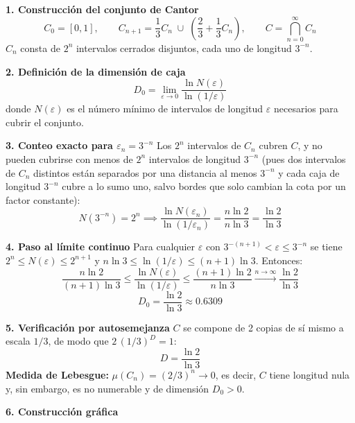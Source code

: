\documentclass[11pt,a4paper]{article}
\newenvironment{solucion}[1][Solución Detallada]{%
    \vspace{1.5mm}%
    \noindent{\large\textbf{Solución:}}\par\vspace{1.5mm}%
}{%
    \par\vspace{3mm}%
}
\begin{document}
\begin{solucion}

\textbf{\large 1. Construcción del conjunto de Cantor}
\[
C_0 = [0, 1], \qquad C_{n+1} = \frac{1}{3}C_n \;\cup\; \left(\frac{2}{3} + \frac{1}{3}C_n\right), \qquad C = \bigcap_{n=0}^\infty C_n
\]
$C_n$ consta de $2^n$ intervalos cerrados disjuntos, cada uno de longitud $3^{-n}$.

\vspace{3.5mm}

\textbf{\large 2. Definición de la dimensión de caja}
\[
\boxed{D_0 = \lim_{\varepsilon \to 0} \frac{\ln N(\varepsilon)}{\ln(1/\varepsilon)}}
\]
donde $N(\varepsilon)$ es el número mínimo de intervalos de longitud $\varepsilon$ necesarios para cubrir el conjunto.

\vspace{3.5mm}

\textbf{\large 3. Conteo exacto para $\varepsilon_n = 3^{-n}$}
Los $2^n$ intervalos de $C_n$ cubren $C$, y no pueden cubrirse con menos de $2^n$ intervalos de longitud $3^{-n}$ (pues dos intervalos de $C_n$ distintos están separados por una distancia al menos $3^{-n}$ y cada caja de longitud $3^{-n}$ cubre a lo sumo uno, salvo bordes que solo cambian la cota por un factor constante):
\[
N(3^{-n}) = 2^n \implies \frac{\ln N(\varepsilon_n)}{\ln(1/\varepsilon_n)} = \frac{n\ln 2}{n\ln 3} = \frac{\ln 2}{\ln 3}
\]

\vspace{3.5mm}

\textbf{\large 4. Paso al límite continuo}
Para cualquier $\varepsilon$ con $3^{-(n+1)} < \varepsilon \le 3^{-n}$ se tiene $2^n \le N(\varepsilon) \le 2^{n+1}$ y $n \ln 3 \le \ln(1/\varepsilon) \le (n+1)\ln 3$. Entonces:
\[
\frac{n \ln 2}{(n+1)\ln 3} \le \frac{\ln N(\varepsilon)}{\ln(1/\varepsilon)} \le \frac{(n+1)\ln 2}{n \ln 3} \xrightarrow{n \to \infty} \frac{\ln 2}{\ln 3}
\]
\[
\boxed{D_0 = \frac{\ln 2}{\ln 3} \approx 0.6309}
\]

\vspace{3.5mm}

\textbf{\large 5. Verificación por autosemejanza}
$C$ se compone de 2 copias de sí mismo a escala $1/3$, de modo que $2\,(1/3)^{D} = 1$:
\[
D = \frac{\ln 2}{\ln 3}
\]
\textbf{Medida de Lebesgue:} $\mu(C_n) = (2/3)^n \to 0$, es decir, $C$ tiene longitud nula y, sin embargo, es no numerable y de dimensión $D_0 > 0$.

\vspace{3.5mm}

\textbf{\large 6. Construcción gráfica}


\end{solucion}
\end{document}
